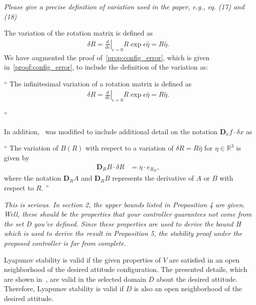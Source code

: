 \documentclass[11pt]{article}
\newcommand{\diff}[2]{\ensuremath{\frac{d #1}{d #2}}}
\newcommand{\dirDiff}[2]{\ensuremath{\mathbf{D}_{#2} #1 \cdot \delta #2}} %
\newcommand{\R}{\ensuremath{\mathbb{R}}}
\newcommand{\D}{\ensuremath{\mathbf{D}}}
\newenvironment{correction}{\begin{list}{}{\setlength{\leftmargin}{1cm}\setlength{\rightmargin}{1cm}}\vspace{\parsep}\item[]``}{''\end{list}}
\begin{document}
\begin{enumerate}
\item \textit{Please give a precise definition of variation used in the paper, e.g., eq. (17) and (18)}

The variation of the rotation matrix is defined as
\begin{align*}
    \delta R = \left. \diff{}{\epsilon} \right|_{\epsilon=0} R \exp{\epsilon \hat{\eta}} = R \hat{\eta} .
\end{align*}
We have augmented the proof of~\cref{prop:config_error}, which is given in~\cref{proof:config_error}, to include the definition of the variation as:
\begin{correction}
The infinitesimal variation of a rotation matrix is defined as
\begin{align*}
    \delta R = \left. \diff{}{\epsilon} \right|_{\epsilon=0} R \exp{\epsilon \hat{\eta}} = R \hat{\eta} .
\end{align*}

\end{correction}

In addition,~ was modified to include additional detail on the notation \( \dirDiff{f}{x}\) as
\begin{correction}
    The variation of \( B(R) \) with respect to a variation of \( \delta R = R \hat{\eta} \) for \( \eta \in \R^3 \) is given by
    \begin{align*}
        \dirDiff{B}{R} &= \eta \cdot e_{R_{B}} ,
    \end{align*}
  where the notation \( \D_R A \) and \(\D_R B\) represents the derivative of \( A \) or \( B \) with respect to \( R\).
\end{correction}

\item \textit{This is serious. In section 2, the upper bounds listed in Proposition 4 are given. Well, these should be the properties that your controller guarantees not come from the set D you've defined. Since these properties are used to derive the bound H which is used to derive the result in Proposition 5, the stability proof under the proposed controller is far from complete.}

Lyapunov stability is valid if the given properties of \( V \) are satisfied in an open neighborhood of the desired attitude configuration. 
The presented details, which are shown in~, are valid in the selected domain \( D \) about the desired attitude.
Therefore, Lyapunov stability is valid if \( D \) is also an open neighborhood of the desired attitude.


\end{enumerate}
\end{document}
